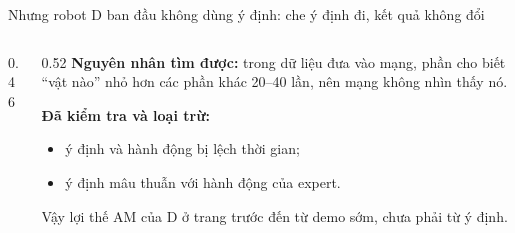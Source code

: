 \begin{frame}{Nhưng robot D ban đầu không dùng ý định: che ý định đi, kết quả không đổi}
  \begin{columns}[c]
    \begin{column}{0.46\textwidth}
      \centering
    \end{column}
    \begin{column}{0.52\textwidth}
      \small
      \textbf{Nguyên nhân tìm được:} trong dữ liệu đưa vào mạng, phần cho biết ``vật nào'' nhỏ hơn các phần khác 20--40 lần, nên mạng không nhìn thấy nó.

      \vspace{0.6em}
      \textbf{Đã kiểm tra và loại trừ:}
      \begin{itemize}
        \item ý định và hành động bị lệch thời gian;
        \item ý định mâu thuẫn với hành động của expert.
      \end{itemize}

      \vspace{0.4em}
      Vậy lợi thế AM của D ở trang trước đến từ demo sớm, chưa phải từ ý định.
    \end{column}
  \end{columns}
\end{frame}

